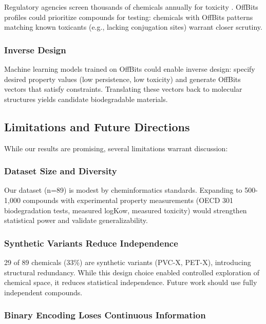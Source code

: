 \documentclass[11pt,letterpaper]{article}
\begin{document}
Regulatory agencies screen thousands of chemicals annually for toxicity \cite{krewski2010toxicity}. OffBits profiles could prioritize compounds for testing: chemicals with OffBits patterns matching known toxicants (e.g., lacking conjugation sites) warrant closer scrutiny.

\subsubsection{Inverse Design}

Machine learning models trained on OffBits could enable inverse design: specify desired property values (low persistence, low toxicity) and generate OffBits vectors that satisfy constraints. Translating these vectors back to molecular structures yields candidate biodegradable materials.

\subsection{Limitations and Future Directions}

While our results are promising, several limitations warrant discussion:

\subsubsection{Dataset Size and Diversity}

Our dataset (n=89) is modest by cheminformatics standards. Expanding to 500-1,000 compounds with experimental property measurements (OECD 301 biodegradation tests, measured logKow, measured toxicity) would strengthen statistical power and validate generalizability.

\subsubsection{Synthetic Variants Reduce Independence}

29 of 89 chemicals (33\%) are synthetic variants (PVC-X, PET-X), introducing structural redundancy. While this design choice enabled controlled exploration of chemical space, it reduces statistical independence. Future work should use fully independent compounds.

\subsubsection{Binary Encoding Loses Continuous Information}
\end{document}
